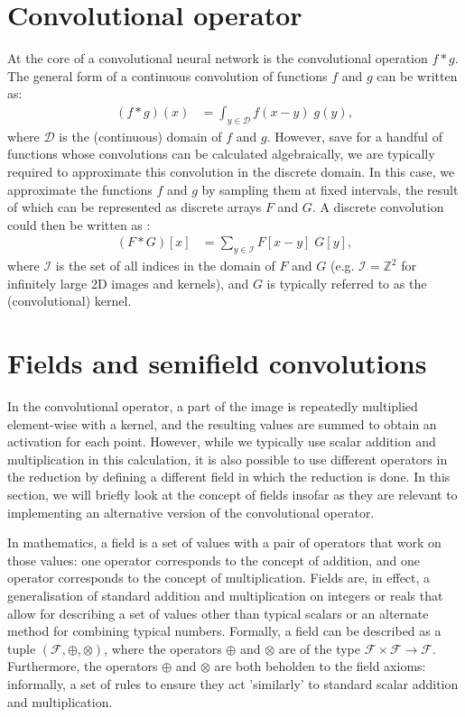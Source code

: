 \documentclass[a4paper, 12pt]{report}
\begin{document}
\section{Convolutional operator}
At the core of a convolutional neural network is the convolutional operation $f*g$. The general form of a continuous convolution of functions $f$ and $g$ can be written as:
\begin{align}
(f*g)(x) &= \int_{y\in\mathcal{D}} f(x-y)\; g(y)	,
\end{align}
where $\mathcal{D}$ is the (continuous) domain of $f$ and $g$. However, save for a handful of functions whose convolutions can be calculated algebraically, we are typically required to approximate this convolution in the discrete domain. In this case, we approximate the functions $f$ and $g$ by sampling them at fixed intervals, the result of which can be represented as discrete arrays $F$ and $G$. A discrete convolution could then be written as \cite{szeliski2022computer}:
\begin{align}
(F*G)[x] &= \sum_{y\in\mathcal{I}} F[x-y]\; G[y],
\end{align}
where $\mathcal{I}$ is the set of all indices in the domain of $F$ and $G$ (e.g. $\mathcal{I}=\mathbb{Z}^2$ for infinitely large 2D images and kernels), and $G$ is typically referred to as the (convolutional) kernel.


\section{Fields and semifield convolutions}
In the convolutional operator, a part of the image is repeatedly multiplied element-wise with a kernel, and the resulting values are summed to obtain an activation for each point. However, while we typically use scalar addition and multiplication in this calculation, it is also possible to use different operators in the reduction by defining a different field in which the reduction is done. In this section, we will briefly look at the concept of fields insofar as they are relevant to implementing an alternative version of the convolutional operator.

In mathematics, a field is a set of values with a pair of operators that work on those values: one operator corresponds to the concept of addition, and one operator corresponds to the concept of multiplication. Fields are, in effect, a generalisation of standard addition and multiplication on integers or reals that allow for describing a set of values other than typical scalars or an alternate method for combining typical numbers. Formally, a field can be described as a tuple $(\mathcal{F}, \oplus, \otimes)$, where the operators $\oplus$ and $\otimes$ are of the type $\mathcal{F}\times\mathcal{F}\rightarrow\mathcal{F}$. Furthermore, the operators $\oplus$ and $\otimes$ are both beholden to the field axioms: informally, a set of rules to ensure they act 'similarly' to standard scalar addition and multiplication. 
\end{document}
